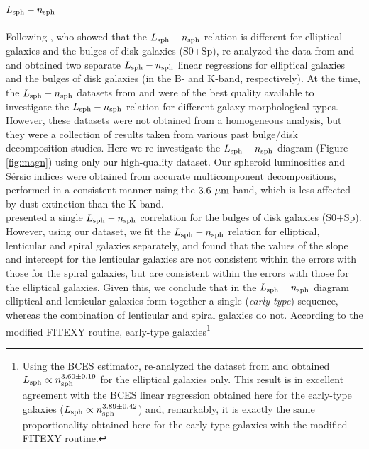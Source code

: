 \documentclass[preprint2]{emulateapj}
\begin{document}
\subsection{$L_{\rm sph} - n_{\rm sph}$}
Following \cite{graham2001bulges}, 
who showed that the $L_{\rm sph} - n_{\rm sph}$ relation is different for elliptical galaxies and the bulges of disk galaxies (S0+Sp), 
\cite{savorgnan2013} re-analyzed the data from \cite{grahamguzman2003} and \cite{grahamworley2008} 
and obtained two separate $L_{\rm sph} - n_{\rm sph}$ linear regressions for elliptical galaxies and the bulges of disk galaxies 
(in the B- and K-band, respectively). 
At the time, the $L_{\rm sph} - n_{\rm sph}$ datasets from \cite{grahamguzman2003} and \cite{grahamworley2008} were of the best quality available 
to investigate the $L_{\rm sph} - n_{\rm sph}$ relation for different galaxy morphological types. 
However, these datasets were not obtained from a homogeneous analysis, 
but they were a collection of results taken from various past bulge/disk decomposition studies. 
Here we re-investigate the $L_{\rm sph} - n_{\rm sph}$ diagram (Figure \ref{fig:magn}) using only our high-quality dataset. 
Our spheroid luminosities and S\'ersic indices were obtained from accurate multicomponent decompositions,  
performed in a consistent manner using the $3.6\rm~\mu m$ band, which is less affected by dust extinction than the K-band. \\
\cite{grahamworley2008} presented a single $L_{\rm sph} - n_{\rm sph}$ correlation for the bulges of disk galaxies (S0+Sp).
However, using our dataset, 
we fit the $L_{\rm sph} - n_{\rm sph}$ relation for elliptical, lenticular and spiral galaxies separately, 
and found that the values of the slope and intercept for the lenticular galaxies 
are not consistent within the errors with those for the spiral galaxies, 
but are consistent within the errors with those for the elliptical galaxies.  
Given this, we conclude that in the $L_{\rm sph} - n_{\rm sph}$ diagram 
elliptical and lenticular galaxies form together a single (\emph{early-type}) sequence, 
whereas the combination of lenticular and spiral galaxies do not. 
According to the modified FITEXY routine, 
early-type galaxies\footnote{Using the BCES estimator, 
\cite{savorgnan2013} re-analyzed the dataset from \cite{grahamguzman2003} 
and obtained $L_{\rm sph} \propto n_{\rm sph}^{3.60 \pm 0.19}$ for the elliptical galaxies only. 
This result is in excellent agreement with the BCES linear regression obtained here for the early-type galaxies 
($L_{\rm sph} \propto n_{\rm sph}^{3.89 \pm 0.42}$) 
and, remarkably, it is exactly the same proportionality obtained here for the early-type galaxies with the modified FITEXY routine. } 
\end{document}
